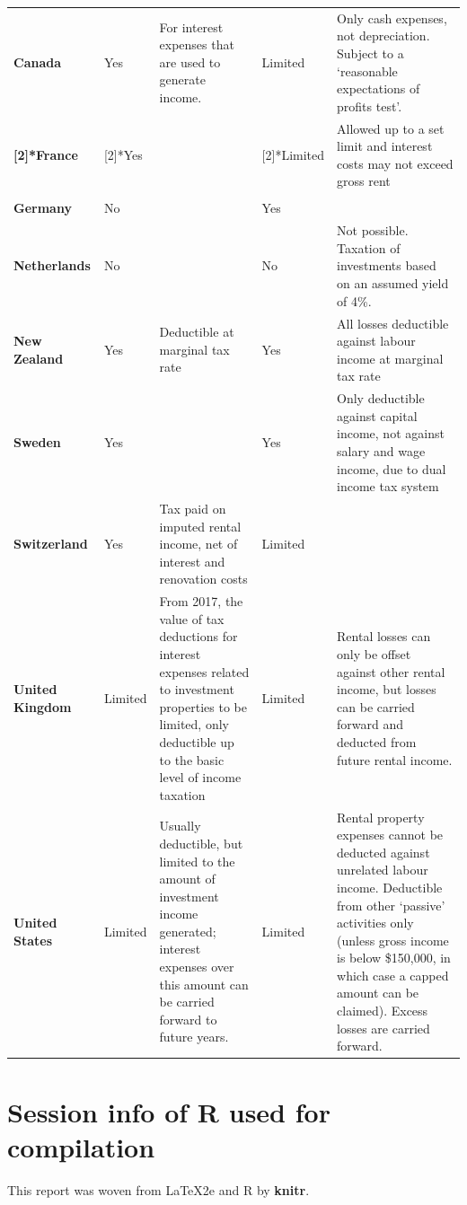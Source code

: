 \begin{subappendices}
{\begin{tabularx}{1.0\linewidth}{>{\bfseries}l>{\raggedleft}p{1.95cm}X>{\raggedleft}p{1.95cm}X}
    Canada & Yes   & For interest expenses that are used to generate income. & Limited & Only cash expenses, not depreciation. Subject to a ‘reasonable expectations of profits test’. \\
    \multirow{2}[2]{*}{France} & \multirow{2}[2]{*}{Yes} & \multirow{2}[2]{*}{} & \multirow{2}[2]{*}{Limited} & {Allowed up to a set limit and interest costs may not exceed gross rent} \\
          &       &       &       &  \\
    Germany & No    &       & Yes   &  \\
    Netherlands & No    &       & No    & Not possible. Taxation of investments based on an assumed yield of 4\%. \\
    New Zealand & Yes   & Deductible at marginal tax rate & Yes   & All losses deductible against labour income at marginal tax rate \\
    Sweden & Yes   &       & Yes   & Only deductible against capital income, not against salary and wage income, due to dual income tax system \\
    Switzerland & Yes   & Tax paid on imputed rental income, net of interest and renovation costs & Limited &  \\
    United Kingdom & Limited & From 2017, the value of tax deductions for interest expenses related to investment properties to be limited, only deductible up to the basic level of income taxation & Limited & Rental losses can only be offset against other rental income, but losses can be carried forward and deducted from future rental income. \\
    United States & Limited & Usually deductible, but limited to the amount of investment income generated; interest expenses over this amount can be carried forward to future years. & Limited & Rental property expenses cannot be deducted against unrelated labour income. Deductible from other ‘passive’ activities only (unless gross income is below \$150,000, in which case a capped amount can be claimed). Excess losses are carried forward. \\
    \bottomrule
    \end{tabularx}
}
\twocolumn



\onecolumn
\chapter{Session info of R used for compilation}
\begin{multicols*}{2}
This report was woven from \LaTeX2e and R by \textbf{knitr}. 


\end{multicols*}
\end{subappendices}
